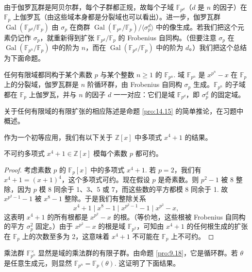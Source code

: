 由于伽罗瓦群是阿贝尔群，每个子群都正规，故每个子域 \(\mathbb{F}_{p^d}\)（\(d\) 是 \(n\) 的因子）在 \(\mathbb{F}_p\) 上伽罗瓦（由这些域本身都是分裂域也可以看出）。进一步，伽罗瓦群 \(\operatorname{Gal}(\mathbb{F}_{p^d}/\mathbb{F}_p)\) 由 \(\sigma_p\) 在商群 \(\operatorname{Gal}(\mathbb{F}_{p^n}/\mathbb{F}_p)/\langle \sigma_p^d \rangle\) 中的像生成。若我们把这个元素仍记作 \(\sigma_p\)，就重新得到扩张 \(\mathbb{F}_{p^d}/\mathbb{F}_p\) 的 Frobenius 自同构。（但要注意 \(\sigma_p\) 在 \(\operatorname{Gal}(\mathbb{F}_{p^n}/\mathbb{F}_p)\) 中的阶为 \(n\)，而在 \(\operatorname{Gal}(\mathbb{F}_{p^d}/\mathbb{F}_p)\) 中的阶为 \(d\)。）我们把这个总结为下面命题。

\begin{proposition}\label{pro:14.15}
任何有限域都同构于某个素数 \(p\) 与某个整数 \(n \geq 1\) 的 \(\mathbb{F}_{p^n}\). 域 \(\mathbb{F}_{p^n}\) 是 \(x^{p^n}-x\) 在 \(\mathbb{F}_p\) 上的分裂域，伽罗瓦群是 \(n\) 阶循环群，由 Frobenius 自同构 \(\sigma_p\) 生成。\(\mathbb{F}_{p^n}\) 的子域都在 \(\mathbb{F}_p\) 上伽罗瓦，并与 \(n\) 的因子 \(d\) 一一对应：它们是域 \(\mathbb{F}_{p^d}\)，即 \(\sigma_p^d\) 的固定域。
\end{proposition}

关于任何有限域的有限扩张的相应陈述是命题 \ref{pro:14.15} 的简单推论，在习题中概述。

作为一个初等应用，我们有以下关于 \(\mathbb{Z}[x]\) 中多项式 \(x^4+1\) 的结果。

\begin{corollary}\label{cor:14.16}
不可约多项式 \(x^4+1 \in \mathbb{Z}[x]\) 模每个素数 \(p\) 都可约。
\end{corollary}

\begin{proof}
考虑素数 \(p\) 的 \(\mathbb{F}_p[x]\) 中的多项式 \(x^4+1\). 若 \(p = 2\)，我们有 \(x^4+1 = (x+1)^4\)，这个多项式可约。现在假设 \(p\) 是奇素数。则 \(p^2-1\) 被 8 整除，因为 \(p\) 模 8 同余于 1、3、5 或 7，而这些数的平方都模 8 同余于 1. 故 \(x^{p^2-1}-1\) 被 \(x^8-1\) 整除。于是我们有整除关系
\[
x^4+1 \mid x^8-1 \mid x^{p^2-1}-1 \mid x^{p^2}-x,
\]
这表明 \(x^4+1\) 的所有根都是 \(x^{p^2}-x\) 的根。（等价地，这些根被 Frobenius 自同构的平方 \(\sigma_p^2\) 固定。）由于 \(x^{p^2}-x\) 的根是域 \(\mathbb{F}_{p^2}\)，可知由 \(x^4+1\) 的任何根生成的扩张在 \(\mathbb{F}_p\) 上的次数至多为 2，这意味着 \(x^4+1\) 不可能在 \(\mathbb{F}_p\) 上不可约。
\end{proof}

乘法群 \(\mathbb{F}_{p^n}^\times\) 显然是域的乘法群的有限子群。由命题 \ref{pro:9.18}，它是循环群。若 \(\theta\) 是任意生成元，则显然 \(\mathbb{F}_{p^n} = \mathbb{F}_p(\theta)\). 这证明了下面结果。

